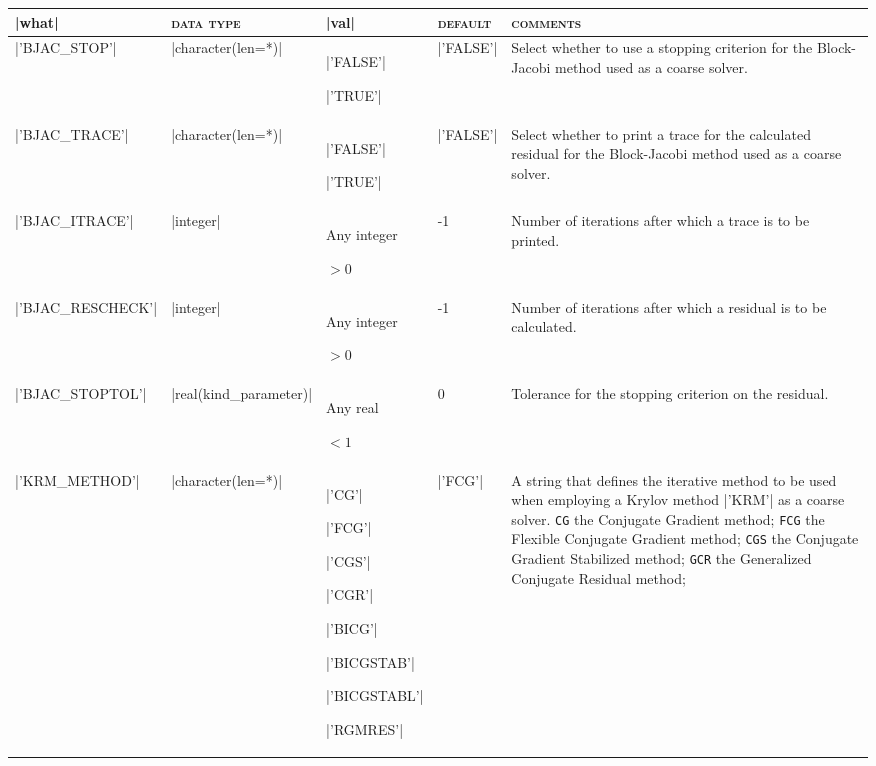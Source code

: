 \bsideways
\begin{center}
	\begin{tabular}{|p{3.9cm}|l|p{2cm}|p{1.7cm}|p{7.7cm}|}
		\hline
		\fortinline|what|              & \textsc{data type}        &  \fortinline|val|      &  \textsc{default}  &
		\textsc{comments} \\ \hline
		\fortinline|'BJAC_STOP'|    & \fortinline|character(len=*)| & \fortinline|'FALSE'| \par \fortinline|'TRUE'| & \fortinline|'FALSE'| & Select whether to use a stopping criterion for the Block-Jacobi method used as a coarse solver.  \\ \hline
		\fortinline|'BJAC_TRACE'|   & \fortinline|character(len=*)| & \fortinline|'FALSE'| \par \fortinline|'TRUE'| & \fortinline|'FALSE'| & Select whether to print a trace for the calculated residual for the Block-Jacobi method used as a coarse solver. \\ \hline 
		\fortinline|'BJAC_ITRACE'|  & \fortinline|integer| & Any integer\par $>0$ & -1 & Number of iterations after which a trace is to be printed. \\ \hline 
		\fortinline|'BJAC_RESCHECK'|& \fortinline|integer| & Any integer\par $>0$ & -1 & Number of iterations after which a residual is to be calculated. \\ \hline
		\fortinline|'BJAC_STOPTOL'| & \fortinline|real(kind_parameter)| & Any real\par $<1$ & 0 & Tolerance for the stopping criterion on the residual.  \\ \hline
		\fortinline|'KRM_METHOD'| & \fortinline|character(len=*)| & \fortinline|'CG'| \par \fortinline|'FCG'| \par \fortinline|'CGS'| \par \fortinline|'CGR'| \par \fortinline|'BICG'| \par \fortinline|'BICGSTAB'| \par \fortinline|'BICGSTABL'| \par \fortinline|'RGMRES'| & \fortinline|'FCG'| & A string that defines the iterative method to be
		used when employing a Krylov method \fortinline|'KRM'| as a coarse solver. \texttt{CG} the Conjugate Gradient method;
		\texttt{FCG} the Flexible Conjugate Gradient method;
		\texttt{CGS} the Conjugate Gradient Stabilized method;
		\texttt{GCR} the Generalized Conjugate Residual method;

\end{tabular}
\end{center}
